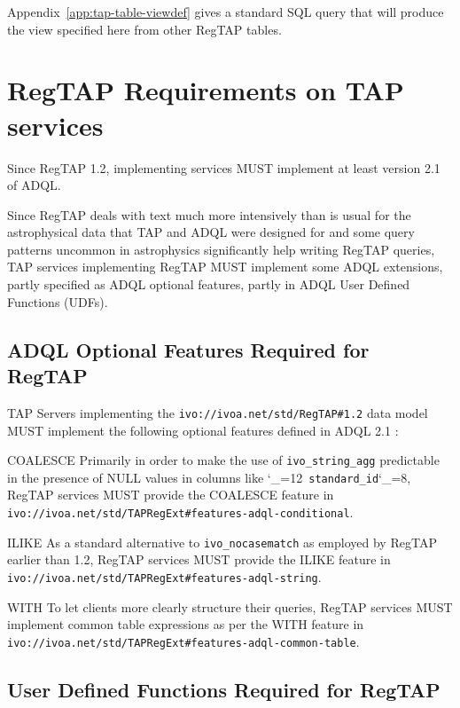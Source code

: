 \documentclass[11pt,a4paper]{ivoa}
\makeatletter
\def\rtent#1{\texttt{\color{rtcolor}\verb|#1|}}
\def\makeunderscoreletter{\catcode`\_=12}
\def\makeunderscoresubscript{\catcode`\_=8}
\def\rtent{\makeunderscoreletter\relax\rt@nt}
\def\rt@nt#1{\texttt{\color{rtcolor} #1}\makeunderscoresubscript{}}
\makeatother
\begin{document}
Appendix~\ref{app:tap-table-viewdef} gives a standard SQL query that
will produce the view specified here from other RegTAP tables.


\section{RegTAP Requirements on TAP services}

Since RegTAP 1.2, implementing services MUST implement at least version
2.1 of ADQL.

Since RegTAP deals with text much more intensively than is usual for the
astrophysical data that TAP and ADQL were designed for and some query
patterns uncommon in astrophysics significantly help writing RegTAP
queries, TAP services implementing RegTAP MUST implement some ADQL
extensions, partly specified as ADQL optional features, partly in ADQL
User Defined Functions (UDFs).


\subsection{ADQL Optional Features Required for RegTAP}

TAP Servers implementing the
\texttt{ivo://ivoa.net/std/RegTAP\#1.2} data model MUST implement the
following optional features defined in ADQL 2.1 \citep{2023ivoa.spec.1215M}:

\begin{bigdescription}
\item[COALESCE] Primarily in order to make the use of
\verb|ivo_string_agg| predictable in the presence of NULL values in
columns like \rtent{standard_id}, RegTAP services MUST provide the
COALESCE feature in
\nolinkurl{ivo://ivoa.net/std/TAPRegExt#features-adql-conditional}.

\item[ILIKE] As a standard alternative to \verb|ivo_nocasematch| as
employed by RegTAP earlier than 1.2, RegTAP services MUST provide the
ILIKE feature in
\nolinkurl{ivo://ivoa.net/std/TAPRegExt#features-adql-string}.

\item[WITH] To let clients more clearly structure their queries, RegTAP
services MUST implement common table expressions as per the WITH feature
in \nolinkurl{ivo://ivoa.net/std/TAPRegExt#features-adql-common-table}.
\end{bigdescription}


\subsection{User Defined Functions Required for RegTAP}
\label{adqludf}
\end{document}

